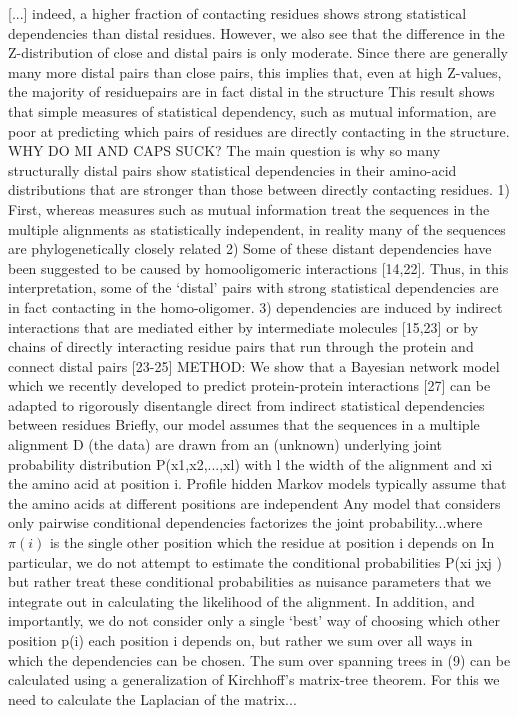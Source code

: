 	[...] indeed, a higher fraction of contacting residues shows strong statistical dependencies than distal residues. However, we also see that the difference in the Z-distribution of close and distal pairs is only moderate. \cite{burger2010disentangling}
	Since there are generally many more distal pairs than close pairs, this implies that, even at high Z-values, the majority of residuepairs are in fact distal in the structure \cite{burger2010disentangling}
	This result shows that simple measures of statistical dependency, such as mutual information, are poor at predicting which pairs of residues are directly contacting in the structure. \cite{burger2010disentangling}
WHY DO MI AND CAPS SUCK?  \cite{burger2010disentangling}
	The main question is why so many structurally distal pairs show statistical dependencies in their amino-acid distributions that are stronger than those between directly contacting residues. \cite{burger2010disentangling}
	1) First, whereas measures such as mutual information treat the sequences in the multiple alignments as statistically independent, in reality many of the sequences are phylogenetically closely related \cite{burger2010disentangling}
	2) Some of these distant dependencies have been suggested to be caused by homooligomeric interactions [14,22]. Thus, in this interpretation, some of the `distal' pairs with strong statistical dependencies are in fact contacting in the homo-oligomer.  \cite{burger2010disentangling}
	3) dependencies are induced by indirect interactions that are mediated either by intermediate molecules [15,23] or by chains of directly interacting residue pairs that run through the protein and connect distal pairs [23-25] \cite{burger2010disentangling}
METHOD: \cite{burger2010disentangling}
	We show that a Bayesian network model which we recently developed to predict protein-protein interactions [27] can be adapted to rigorously disentangle direct from indirect statistical dependencies between residues \cite{burger2010disentangling}
	Briefly, our model assumes that the sequences in a multiple alignment D (the data) are drawn from an (unknown) underlying joint probability distribution P(x1,x2,...,xl) with l the width of the alignment and xi the amino acid at position i. Profile hidden Markov models typically assume that the amino acids at different positions are independent  \cite{burger2010disentangling}
	Any model that considers only pairwise conditional dependencies factorizes the joint probability...where $\pi(i)$ is the single other position which the residue at position i depends on \cite{burger2010disentangling}
	In particular, we do not attempt to estimate the conditional probabilities P(xi jxj ) but rather treat these conditional probabilities as nuisance parameters that we integrate out in calculating the likelihood of the alignment. \cite{burger2010disentangling}
	In addition, and importantly, we do not consider only a single `best' way of choosing which other position p(i) each position i depends on, but rather we sum over all ways in which the dependencies can be chosen.  \cite{burger2010disentangling}
	The sum over spanning trees in (9) can be calculated using a generalization of Kirchhoff's matrix-tree theorem. For this we need to calculate the Laplacian of the matrix... \cite{burger2010disentangling}

